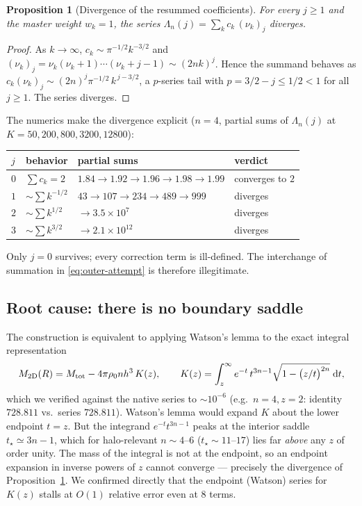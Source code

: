 \documentclass{article}
\newtheorem{proposition}{Proposition}
\begin{document}
\begin{proposition}[Divergence of the resummed coefficients]\label{prop:lambda}
For every $j\ge1$ and the master weight $w_k=1$, the series
$\Lambda_n(j)=\sum_k c_k\,(\nu_k)_j$ diverges.
\end{proposition}

\begin{proof}
As $k\to\infty$, $c_k\sim\pi^{-1/2}k^{-3/2}$ and
$(\nu_k)_j=\nu_k(\nu_k+1)\cdots(\nu_k+j-1)\sim(2nk)^j$.  Hence the summand
behaves as $c_k(\nu_k)_j\sim(2n)^j\pi^{-1/2}\,k^{\,j-3/2}$, a $p$-series tail
with $p=3/2-j\le1/2<1$ for all $j\ge1$.  The series diverges.
\end{proof}

The numerics make the divergence explicit ($n=4$, partial sums of
$\Lambda_n(j)$ at $K=50,200,800,3200,12800$):
\begin{center}
\begin{tabular}{llll}
\toprule
$j$ & behavior & partial sums & verdict\\
\midrule
$0$ & $\sum c_k=2$ & $1.84\to1.92\to1.96\to1.98\to1.99$ & converges to $2$\\
$1$ & $\sim\!\sum k^{-1/2}$ & $43\to107\to234\to489\to999$ & diverges\\
$2$ & $\sim\!\sum k^{1/2}$ & $\to3.5\times10^{7}$ & diverges\\
$3$ & $\sim\!\sum k^{3/2}$ & $\to2.1\times10^{12}$ & diverges\\
\bottomrule
\end{tabular}
\end{center}
Only $j=0$ survives; every correction term is ill-defined.  The interchange of
summation in \eqref{eq:outer-attempt} is therefore illegitimate.

\subsection{Root cause: there is no boundary saddle}

The construction is equivalent to applying Watson's lemma to the exact
integral representation
\begin{equation}\label{eq:Kint}
M_{\rm 2D}(R)=M_{\rm tot}-4\pi\rho_0 nh^3\,K(z),
\qquad
K(z)=\int_z^{\infty}e^{-t}\,t^{3n-1}\sqrt{1-\bigl(z/t\bigr)^{2n}}\;\mathrm{d}t,
\end{equation}
which we verified against the native series to $\sim10^{-6}$ (e.g.\ $n=4,z=2$:
identity $728.811$ vs.\ series $728.811$).  Watson's lemma would expand $K$
about the lower endpoint $t=z$.  But the integrand $e^{-t}t^{3n-1}$ peaks at the
interior saddle $t_\star\simeq 3n-1$, which for halo-relevant $n\sim4$--$6$
($t_\star\sim11$--$17$) lies far \emph{above} any $z$ of order unity.  The mass
of the integral is not at the endpoint, so an endpoint expansion in inverse
powers of $z$ cannot converge --- precisely the divergence of
Proposition~\ref{prop:lambda}.  We confirmed directly that the endpoint
(Watson) series for $K(z)$ stalls at $O(1)$ relative error even at $8$ terms.
\end{document}
